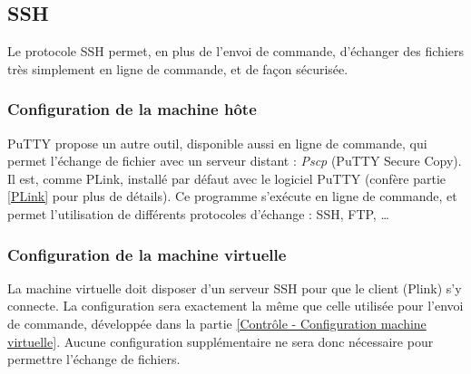 
\subsection{SSH}
\label{Échange par SSH}

Le protocole SSH permet, en plus de l'envoi de commande, d'échanger des fichiers très simplement en ligne de commande, et de façon sécurisée.
\\




\subsubsection{Configuration de la machine hôte}

PuTTY propose un autre outil, disponible aussi en ligne de commande, qui permet l'échange de fichier avec un serveur distant : \textit{Pscp} (PuTTY Secure Copy).
Il est, comme PLink, installé par défaut avec le logiciel PuTTY (confère partie \ref{PLink} pour plus de détails).
Ce programme s'exécute en ligne de commande, et permet l'utilisation de différents protocoles d'échange : SSH, FTP, \ldots
\\




\subsubsection{Configuration de la machine virtuelle}

La machine virtuelle doit disposer d'un serveur SSH pour que le client (Plink) s'y connecte.
La configuration sera exactement la même que celle utilisée pour l'envoi de commande, développée dans la partie \ref{Contrôle - Configuration machine virtuelle}.
Aucune configuration supplémentaire ne sera donc nécessaire pour permettre l'échange de fichiers.
\\



